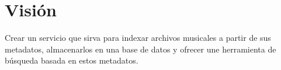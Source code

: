 
\section*{Visión}

\noindent Crear un servicio que sirva para indexar archivos musicales a partir de sus 
metadatos, almacenarlos en una base de datos y ofrecer une herramienta de búsqueda basada
en estos metadatos.

